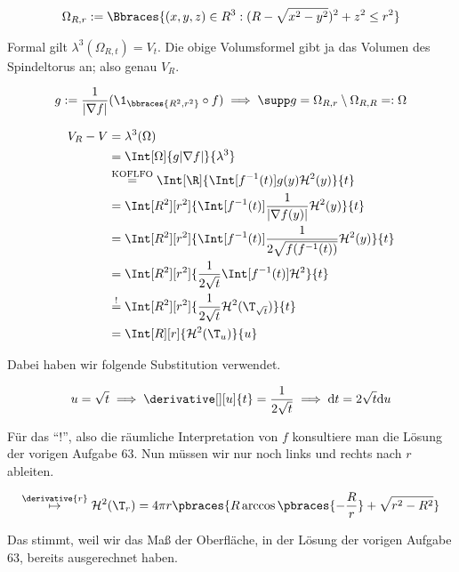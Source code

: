 \begin{solution}

\begin{align*}
    \Omega_{R, r}
    :=
    \Bbraces
    {
        (x, y, z) \in R^3:
        (R - \sqrt{x^2 - y^2})^2 + z^2 \leq r^2
    }
\end{align*}

Formal gilt $\lambda^3(\Omega_{R, t}) = V_t$.
Die obige Volumsformel gibt ja das Volumen des Spindeltorus an; also genau $V_R$.

\begin{align*}
    g := \frac{1}{|\nabla f|} (\1_\bbraces{R^2, r^2} \circ f)
    \implies
    \supp g = \Omega_{R, r} \setminus \Omega_{R, R} =: \Omega
\end{align*}

\begin{align*}
    V_R - V
    & =
    \lambda^3(\Omega) \\
    & =
    \Int[\Omega]
    {
        g |\nabla f|
    }{\lambda^3} \\
    & \stackrel
    {
        \text{KOFLFO}
    }{=}
    \Int[\R]
    {
        \Int[f^{-1}(t)]
        {
            g(y)
        }{\mathcal{H}^2(y)}
    }{t} \\
    & =
    \Int[R^2][r^2]
    {
        \Int[f^{-1}(t)]
        {
            \frac{1}{|\nabla f(y)|}
        }{\mathcal{H}^2(y)}
    }{t} \\
    & =
    \Int[R^2][r^2]
    {
        \Int[f^{-1}(t)]
        {
            \frac{1}{2 \sqrt{f(f^{-1}(t))}}
        }{\mathcal{H}^2(y)}
    }{t} \\
    & =
    \Int[R^2][r^2]
    {
        \frac{1}{2 \sqrt t}
        \Int[f^{-1}(t)]{}{\mathcal{H}^2}
    }{t} \\
    & \stackrel{!}{=}
    \Int[R^2][r^2]
    {
        \frac{1}{2 \sqrt t}
        \mathcal{H}^2(\T_{\sqrt{t}})
    }{t} \\
    & =
    \Int[R][r]
    {
        \mathcal{H}^2(\T_u)
    }{u}
\end{align*}

Dabei haben wir folgende Substitution verwendet.

\begin{align*}
    u = \sqrt t
    \implies
    \derivative[][u]{t} = \frac{1}{2 \sqrt t} \implies \mathrm{d} t = 2 \sqrt t \mathrm{d} u
\end{align*}

Für das \enquote{!}, also die räumliche Interpretation von $f$ konsultiere man die Lösung der vorigen Aufgabe 63.
Nun müssen wir nur noch links und rechts nach $r$ ableiten.

\begin{align*}
    \stackrel
    {
        \derivative{r}
    }{\mapsto}
    \mathcal{H}^2(\T_r)
    =
    4 \pi r
    \pbraces
    {
        R
        \arccos \pbraces{-\frac{R}{r}}
        +
        \sqrt{r^2 - R^2}
    }
\end{align*}

Das stimmt, weil wir das Maß der Oberfläche, in der Lösung der vorigen Aufgabe 63, bereits ausgerechnet haben.

\end{solution}

